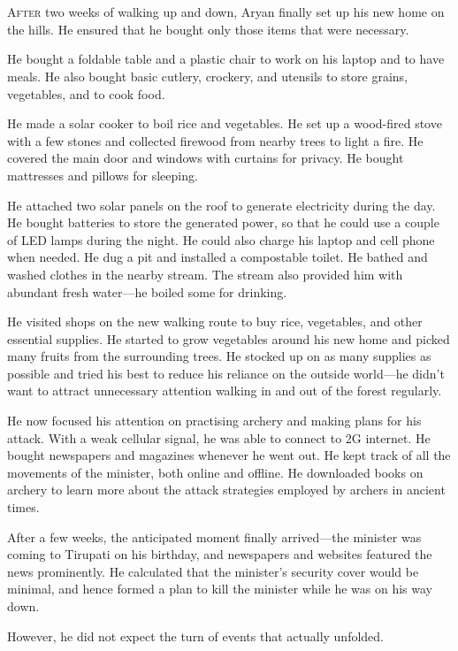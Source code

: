 \chapter{}

\lettrine{A}{fter} two weeks of walking up and down, Aryan finally set up his
new home on the hills. He ensured that he bought only those items that were necessary.

He bought a foldable table and a plastic chair to work on his laptop and to have
meals. He also bought basic cutlery, crockery, and utensils to store grains,
vegetables, and to cook food.

He made a solar cooker to boil rice and vegetables. He set up a
wood-fired stove with a few stones and collected firewood from nearby trees to
light a fire. He covered the main door and windows with curtains for privacy. He bought
mattresses and pillows for sleeping.

He attached two solar panels on the roof to generate electricity during the
day. He bought batteries to store the generated power, so that he could
use a couple of LED lamps during the night. He could also charge his
laptop and cell phone when needed. He dug a pit and installed a
compostable toilet. He bathed and washed clothes in the nearby stream. The
stream also provided him with abundant fresh water—he boiled some for drinking.

He visited shops on the new walking route to buy rice, vegetables, and other essential
supplies. He started to grow vegetables around his new home and picked many fruits
from the surrounding trees. He stocked up on as many supplies as possible and tried his
best to reduce his reliance on the outside world—he didn't want to attract
unnecessary attention walking in and out of the forest regularly.

He now focused his attention on practising archery and making plans for his
attack. With a weak cellular signal, he was able to connect to 2G internet. He
bought newspapers and magazines whenever he went out. He kept track of all the
movements of the minister, both online and offline. He downloaded books on
archery to learn more about the attack strategies employed by archers in ancient
times.

After a few weeks, the anticipated moment finally arrived—the minister was
coming to Tirupati on his birthday, and newspapers and websites featured the news
prominently. He calculated that the minister's security cover would be minimal,
and hence formed a plan to kill the minister while he was on his way down.

However, he did not expect the turn of events that actually unfolded.